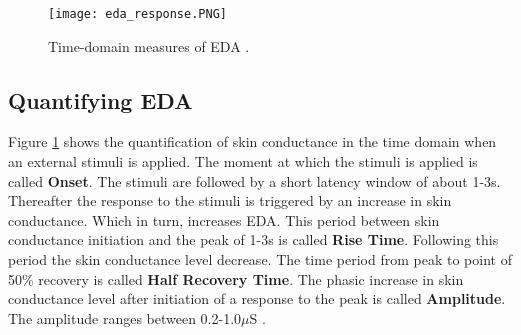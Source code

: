 \begin{figure}
    \centering
    \texttt{[image: eda\_response.PNG]}
    \caption{Time-domain measures of EDA \cite{cacioppo_electrodermal_2016_p_217_243}.}
    \label{fig:eda_graph}
\end{figure}

\subsection{Quantifying EDA}
\label{sec:quantify_eda}
Figure \ref{fig:eda_graph} shows the quantification of skin conductance in the time domain when an external stimuli is applied. The moment at which the stimuli is applied is called \textbf{Onset}. The stimuli are followed by a short latency window of about 1-3s. Thereafter the response to the stimuli is triggered by an increase in skin conductance. Which in turn, increases EDA. This period between skin conductance initiation and the peak of 1-3s is called \textbf{Rise Time}. Following this period the skin conductance level decrease. The time period from peak to point of 50$\%$ recovery is called \textbf{Half Recovery Time}. The phasic increase in skin conductance level after initiation of a response to the peak is called \textbf{Amplitude}. The amplitude ranges between 0.2-1.0$\mu$S \cite{cacioppo_electrodermal_2016_p_217_243}.

